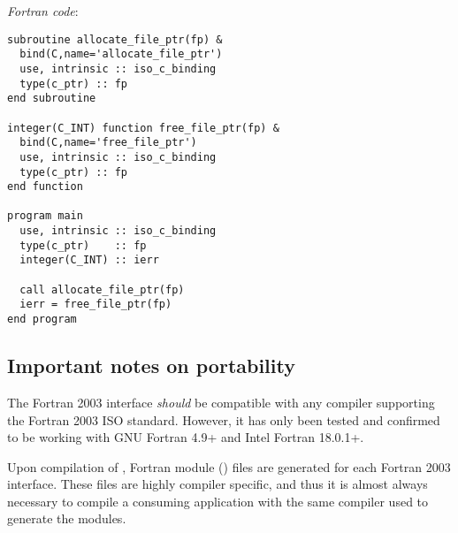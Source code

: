 \noindent \emph{Fortran code}:
\begin{verbatim}
subroutine allocate_file_ptr(fp) &
  bind(C,name='allocate_file_ptr')
  use, intrinsic :: iso_c_binding
  type(c_ptr) :: fp
end subroutine

integer(C_INT) function free_file_ptr(fp) &
  bind(C,name='free_file_ptr')
  use, intrinsic :: iso_c_binding
  type(c_ptr) :: fp
end function

program main
  use, intrinsic :: iso_c_binding
  type(c_ptr)    :: fp
  integer(C_INT) :: ierr

  call allocate_file_ptr(fp)
  ierr = free_file_ptr(fp)
end program
\end{verbatim}



\subsection{Important notes on portability}\label{ss:f2003_portability}

The {\sundials} Fortran 2003 interface \textit{should} be compatible with any compiler
supporting the Fortran 2003 ISO standard. However, it has only been tested and confirmed
to be working with GNU Fortran 4.9+ and Intel Fortran 18.0.1+. 

Upon compilation of {\sundials}, Fortran module () files are generated
for each Fortran 2003 interface. These files are highly compiler specific, and
thus it is almost always necessary to compile a consuming application with the
same compiler used to generate the modules.

